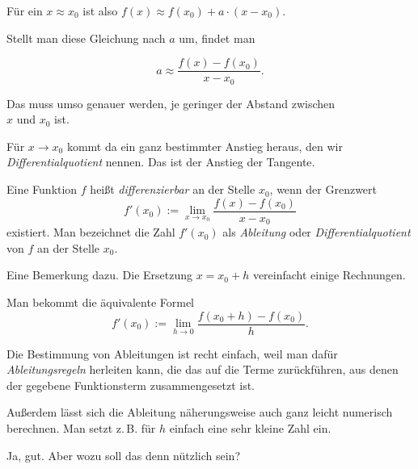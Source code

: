 \documentclass[9pt]{beamer}
\begin{document}
\begin{frame}
Für ein $x\approx x_0$ ist also $f(x)\approx f(x_0)+a\cdot (x-x_0)$.
\pause

\vspace{0.8em}
Stellt man diese Gleichung nach $a$ um,\pause{} findet man

\[a \approx \frac{f(x)-f(x_0)}{x-x_0}.\]\pause

Das muss umso genauer werden, je geringer der Abstand zwischen\\
$x$ und $x_0$ ist.\pause

\vspace{0.8em}
Für $x\to x_0$ kommt da ein ganz bestimmter Anstieg heraus, den
wir \emph{Differentialquotient} nennen. Das ist der
Anstieg der Tangente.
\end{frame}

\begin{frame}
\begin{Definition}
Eine Funktion $f$ heißt \emph{differenzierbar}
an der Stelle $x_0$, wenn der Grenzwert
\[f'(x_0) := \lim_{x\to x_0}\frac{f(x)-f(x_0)}{x-x_0}\]
existiert. Man bezeichnet die Zahl $f'(x_0)$ als \emph{Ableitung} oder
\emph{Differentialquotient} von $f$ an der Stelle $x_0$.
\end{Definition}
\end{frame}

\begin{frame}
Eine Bemerkung dazu. Die Ersetzung $x=x_0+h$ vereinfacht einige
Rechnungen.\pause

\vspace{0.8em}
Man bekommt die äquivalente Formel
\[f'(x_0) := \lim_{h\to 0} \frac{f(x_0+h)-f(x_0)}{h}.\]
\end{frame}

\begin{frame}
Die Bestimmung von Ableitungen ist recht einfach, weil man dafür
\emph{Ableitungsregeln} herleiten kann, die das auf die Terme
zurückführen, aus denen der gegebene Funktionsterm
zusammengesetzt ist.\pause

\vspace{0.8em}
Außerdem lässt sich die Ableitung näherungsweise auch ganz leicht
numerisch berechnen. Man setzt z.\,B. für $h$ einfach eine sehr
kleine Zahl ein.
\end{frame}

\begin{frame}
Ja, gut. Aber wozu soll das denn nützlich sein?
\end{frame}
\end{document}
